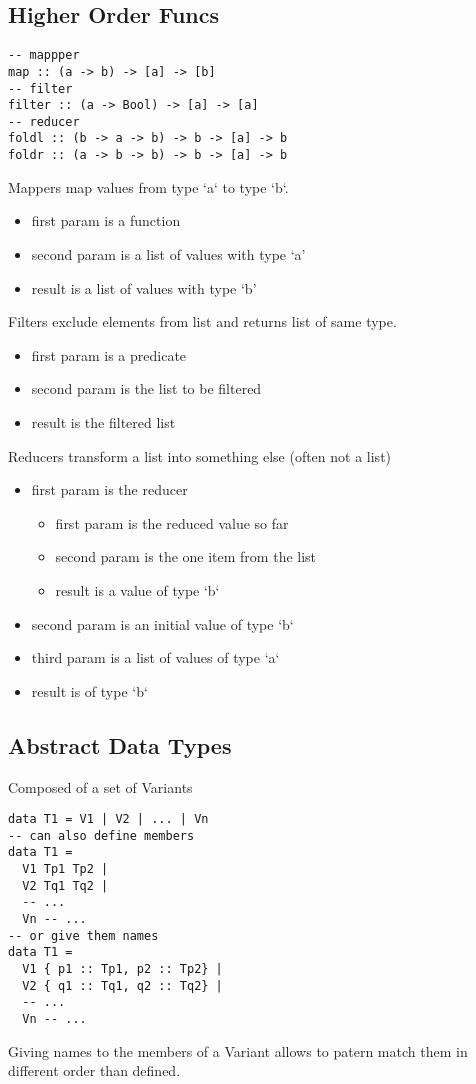 \subsection*{Higher Order Funcs}
\begin{verbatim}
-- mappper
map :: (a -> b) -> [a] -> [b]
-- filter
filter :: (a -> Bool) -> [a] -> [a]
-- reducer
foldl :: (b -> a -> b) -> b -> [a] -> b
foldr :: (a -> b -> b) -> b -> [a] -> b
\end{verbatim}
Mappers map values from type `a` to type `b`.
\begin{itemize}
  \item first param is a function
  \item second param is a list of values with type `a'
  \item result is a list of values with type `b'
\end{itemize}
Filters exclude elements from list and returns list of same type.
\begin{itemize}
  \item first param is a predicate
  \item second param is the list to be filtered
  \item result is the filtered list
\end{itemize}
Reducers transform a list into something else (often not a list)
\begin{itemize}
  \item first param is the reducer
  \begin{itemize}
    \item first param is the reduced value so far
    \item second param is the one item from the list
    \item result is a value of type `b`
  \end{itemize}
  \item second param is an initial value of type `b`
  \item third param is a list of values of type `a`
  \item result is of type `b`
\end{itemize}

\subsection*{Abstract Data Types}
Composed of a set of Variants
\begin{verbatim}
data T1 = V1 | V2 | ... | Vn
-- can also define members
data T1 =
  V1 Tp1 Tp2 |
  V2 Tq1 Tq2 |
  -- ...
  Vn -- ...
-- or give them names
data T1 =
  V1 { p1 :: Tp1, p2 :: Tp2} |
  V2 { q1 :: Tq1, q2 :: Tq2} |
  -- ...
  Vn -- ...
\end{verbatim}
Giving names to the members of a Variant allows to patern match them in
different order than defined.

